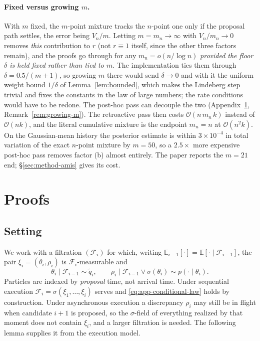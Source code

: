 \documentclass[10pt]{article}
\theoremstyle{plain}
\theoremstyle{definition}
\begin{document}
\paragraph{Fixed versus growing $m$.} With $m$ fixed, the $m$-point mixture tracks the $n$-point one only if the proposal path settles, the error being $V_n/m$. Letting $m=m_n\to\infty$ with $V_n/m_n\to0$ removes \emph{this} contribution to $r$ (not $r\equiv1$ itself, since the other three factors remain), and the proofs go through for any $m_n=o(n/\log n)$ \emph{provided the floor $\delta$ is held fixed rather than tied to $m$}. The implementation ties them through $\delta=0.5/(m{+}1)$, so growing $m$ there would send $\delta\to0$ and with it the uniform weight bound $1/\delta$ of Lemma~\ref{lem:bounded}, which makes the Lindeberg step trivial and fixes the constants in the law of large numbers; the rate conditions would have to be redone. The post-hoc pass can decouple the two (Appendix~\ref{app:theory}, Remark~\ref{rem:growing-m}). The retroactive pass then costs $\mathcal{O}(n\,m_n\,k)$ instead of $\mathcal{O}(nk)$, and the literal cumulative mixture is the endpoint $m_n=n$ at $\mathcal{O}(n^2k)$. On the Gaussian-mean history the posterior estimate is within $3\times10^{-4}$ in total variation of the exact $n$-point mixture by $m=50$, so a $2.5\times$ more expensive post-hoc pass removes factor (b) almost entirely. The paper reports the $m=21$ end; \S\ref{sec:method-amis} gives its cost.

\section{Proofs}\label{app:theory}

\subsection{Setting}\label{app:theory-setting}
We work with a filtration $(\mathcal{F}_i)$ for which, writing $\mathbb{E}_{i-1}[\cdot]=\mathbb{E}[\cdot\mid\mathcal{F}_{i-1}]$, the pair $\xi_i=(\theta_i,\rho_i)$ is $\mathcal{F}_i$-measurable and
\begin{equation}
\theta_i\mid\mathcal{F}_{i-1}\sim \tilde q_i,
\qquad
\rho_i\mid\mathcal{F}_{i-1}\vee\sigma(\theta_i)\sim p(\cdot\mid\theta_i).
\label{eq:app-conditional-law}
\end{equation}
Particles are indexed by \emph{proposal} time, not arrival time. Under sequential execution $\mathcal{F}_i=\sigma(\xi_1,\dots,\xi_i)$ serves and \eqref{eq:app-conditional-law} holds by construction. Under asynchronous execution a discrepancy $\rho_i$ may still be in flight when candidate $i+1$ is proposed, so the $\sigma$-field of everything realized by that moment does not contain $\xi_i$, and a larger filtration is needed. The following lemma supplies it from the execution model.
\end{document}
